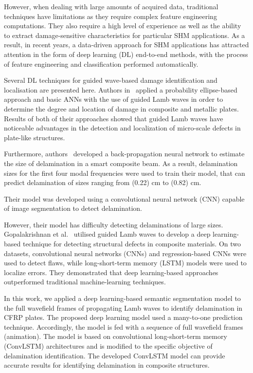 \documentclass{IOS-Book-Article}
\begin{document}
\begin{sloppypar}
	However, when dealing with large amounts of acquired data, traditional techniques have limitations as they require complex feature engineering computations.
	They also require a high level of experience as well as the ability to extract damage-sensitive characteristics for particular SHM applications.
	As a result, in recent years, a data-driven approach for SHM applications has attracted attention in the form of deep learning (DL) end-to-end methods, with the process of feature engineering and classification performed automatically.
	
	Several DL techniques for guided wave-based damage identification and localisation are presented here.
	Authors in~\cite{DeFenza2015a} applied a probability ellipse-based approach and 
	basic ANNs with the use of guided Lamb waves in order to  determine the degree 
	and location of damage in composite and metallic plates. Results of both of 
	their approaches showed that guided Lamb waves have noticeable advantages in 
	the detection and localization of micro-scale defects in plate-like 
	structures. 
	
	Furthermore, authors~\cite{okafor1996delamination} developed a back-propagation neural network to estimate the size of delamination in a smart composite beam.
	As a result, delamination sizes for the first four modal frequencies were used to train their model, that can predict delamination of sizes ranging from (0.22) cm to (0.82) cm.
	
	Their model was developed using a convolutional neural network (CNN) capable of image segmentation to detect delamination.
	
	However, their model has difficulty detecting delaminations of large sizes.
	Gopalakrishnan et al.~\cite{Gopalakrishnan2021} utilised guided Lamb waves to develop a deep learning-based technique for detecting structural defects in composite materials.
	On two datasets, convolutional neural networks (CNNs) and regression-based CNNs were used to detect flaws, while long-short-term memory (LSTM) models were used to localize errors.
	They demonstrated that deep learning-based approaches outperformed traditional machine-learning techniques.
	
	In this work, we applied a deep learning-based semantic segmentation model to the full wavefield frames of propagating Lamb waves to identify delamination in CFRP plates.
	The proposed deep learning model used a many-to-one prediction technique.
	Accordingly, the model is fed with a sequence of full wavefield frames (animation).
	The model is based on convolutional long-short-term memory (ConvLSTM) architectures and is modified to the specific objective of delamination identification.
	The developed ConvLSTM model can provide accurate results for identifying delamination in composite structures.
\end{sloppypar}
\end{document}
